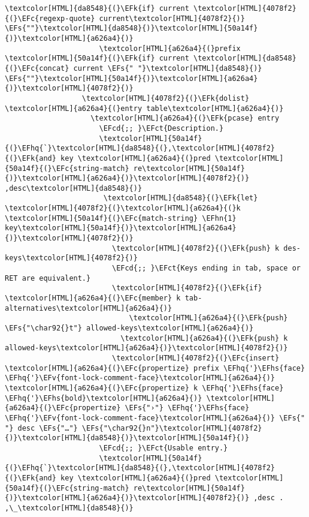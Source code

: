 \documentclass{scrartcl}
\newcommand{\EFk}[1]{\textcolor{EFk}{#1}} %
\newcommand{\EFs}[1]{\textcolor{EFs}{#1}} %
\newcommand{\EFct}[1]{\textcolor{EFct}{#1}} %
\newcommand{\EFc}[1]{\textcolor{EFc}{#1}} %
\newcommand{\EFv}[1]{\textcolor{EFv}{#1}} %
\newcommand{\EFcd}[1]{\textcolor{EFcd}{#1}} %
\newcommand{\EFhn}[1]{\textcolor{EFhn}{\textbf{#1}}} %
\newcommand{\EFhq}[1]{\textcolor{EFhq}{#1}} %
\newcommand{\EFhs}[1]{\textcolor{EFhs}{#1}} %
\begin{document}
\begin{Code}
\begin{Verbatim}[]
                                  \textcolor[HTML]{da8548}{(}\EFk{if} current \textcolor[HTML]{4078f2}{(}\EFc{regexp-quote} current\textcolor[HTML]{4078f2}{)} \EFs{""}\textcolor[HTML]{da8548}{)}\textcolor[HTML]{50a14f}{)}\textcolor[HTML]{a626a4}{)}
                      \textcolor[HTML]{a626a4}{(}prefix \textcolor[HTML]{50a14f}{(}\EFk{if} current \textcolor[HTML]{da8548}{(}\EFc{concat} current \EFs{" "}\textcolor[HTML]{da8548}{)} \EFs{""}\textcolor[HTML]{50a14f}{)}\textcolor[HTML]{a626a4}{)}\textcolor[HTML]{4078f2}{)}
                  \textcolor[HTML]{4078f2}{(}\EFk{dolist} \textcolor[HTML]{a626a4}{(}entry table\textcolor[HTML]{a626a4}{)}
                    \textcolor[HTML]{a626a4}{(}\EFk{pcase} entry
                      \EFcd{;; }\EFct{Description.}
                      \textcolor[HTML]{50a14f}{(}\EFhq{`}\textcolor[HTML]{da8548}{(},\textcolor[HTML]{4078f2}{(}\EFk{and} key \textcolor[HTML]{a626a4}{(}pred \textcolor[HTML]{50a14f}{(}\EFc{string-match} re\textcolor[HTML]{50a14f}{)}\textcolor[HTML]{a626a4}{)}\textcolor[HTML]{4078f2}{)} ,desc\textcolor[HTML]{da8548}{)}
                       \textcolor[HTML]{da8548}{(}\EFk{let} \textcolor[HTML]{4078f2}{(}\textcolor[HTML]{a626a4}{(}k \textcolor[HTML]{50a14f}{(}\EFc{match-string} \EFhn{1} key\textcolor[HTML]{50a14f}{)}\textcolor[HTML]{a626a4}{)}\textcolor[HTML]{4078f2}{)}
                         \textcolor[HTML]{4078f2}{(}\EFk{push} k des-keys\textcolor[HTML]{4078f2}{)}
                         \EFcd{;; }\EFct{Keys ending in tab, space or RET are equivalent.}
                         \textcolor[HTML]{4078f2}{(}\EFk{if} \textcolor[HTML]{a626a4}{(}\EFc{member} k tab-alternatives\textcolor[HTML]{a626a4}{)}
                             \textcolor[HTML]{a626a4}{(}\EFk{push} \EFs{"\char92{}t"} allowed-keys\textcolor[HTML]{a626a4}{)}
                           \textcolor[HTML]{a626a4}{(}\EFk{push} k allowed-keys\textcolor[HTML]{a626a4}{)}\textcolor[HTML]{4078f2}{)}
                         \textcolor[HTML]{4078f2}{(}\EFc{insert} \textcolor[HTML]{a626a4}{(}\EFc{propertize} prefix \EFhq{'}\EFhs{face} \EFhq{'}\EFv{font-lock-comment-face}\textcolor[HTML]{a626a4}{)} \textcolor[HTML]{a626a4}{(}\EFc{propertize} k \EFhq{'}\EFhs{face} \EFhq{'}\EFhs{bold}\textcolor[HTML]{a626a4}{)} \textcolor[HTML]{a626a4}{(}\EFc{propertize} \EFs{"›"} \EFhq{'}\EFhs{face} \EFhq{'}\EFv{font-lock-comment-face}\textcolor[HTML]{a626a4}{)} \EFs{"  "} desc \EFs{"…"} \EFs{"\char92{}n"}\textcolor[HTML]{4078f2}{)}\textcolor[HTML]{da8548}{)}\textcolor[HTML]{50a14f}{)}
                      \EFcd{;; }\EFct{Usable entry.}
                      \textcolor[HTML]{50a14f}{(}\EFhq{`}\textcolor[HTML]{da8548}{(},\textcolor[HTML]{4078f2}{(}\EFk{and} key \textcolor[HTML]{a626a4}{(}pred \textcolor[HTML]{50a14f}{(}\EFc{string-match} re\textcolor[HTML]{50a14f}{)}\textcolor[HTML]{a626a4}{)}\textcolor[HTML]{4078f2}{)} ,desc . ,\_\textcolor[HTML]{da8548}{)}

\end{Verbatim}
\end{Code}
\end{document}
